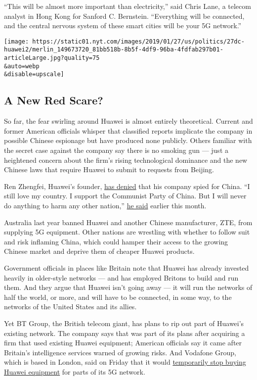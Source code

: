 ``This will be almost more important than electricity,'' said Chris
Lane, a telecom analyst in Hong Kong for Sanford C. Bernstein.
``Everything will be connected, and the central nervous system of these
smart cities will be your 5G network.''

\texttt{[image: https://static01.nyt.com/images/2019/01/27/us/politics/27dc-huawei2/merlin\_149673720\_81bb518b-8b5f-4df9-96ba-4fdfab297b01-articleLarge.jpg?quality=75\\\&auto=webp\\\&disable=upscale]}

\hypertarget{a-new-red-scare}{%
\subsection{A New Red Scare?}\label{a-new-red-scare}}

So far, the fear swirling around Huawei is almost entirely theoretical.
Current and former American officials whisper that classified reports
implicate the company in possible Chinese espionage but have produced
none publicly. Others familiar with the secret case against the company
say there is no smoking gun --- just a heightened concern about the
firm's rising technological dominance and the new Chinese laws that
require Huawei to submit to requests from Beijing.

Ren Zhengfei, Huawei's founder,
\href{https://www.nytimes.com/2019/01/15/technology/huawei-ren-zhengfei.html}{has
denied} that his company spied for China. ``I still love my country. I
support the Communist Party of China. But I will never do anything to
harm any other nation,''
\href{https://www.scmp.com/tech/big-tech/article/2182367/transcript-huawei-founder-ren-zhengfeis-responses-media-questions}{he
said} earlier this month.

Australia last year banned Huawei and another Chinese manufacturer, ZTE,
from supplying 5G equipment. Other nations are wrestling with whether to
follow suit and risk inflaming China, which could hamper their access to
the growing Chinese market and deprive them of cheaper Huawei products.

Government officials in places like Britain note that Huawei has already
invested heavily in older-style networks --- and has employed Britons to
build and run them. And they argue that Huawei isn't going away --- it
will run the networks of half the world, or more, and will have to be
connected, in some way, to the networks of the United States and its
allies.

Yet BT Group, the British telecom giant, has plans to rip out part of
Huawei's existing network. The company says that was part of its plans
after acquiring a firm that used existing Huawei equipment; American
officials say it came after Britain's intelligence services warned of
growing risks. And Vodafone Group, which is based in London, said on
Friday that it would
\href{https://www.nytimes.com/2019/01/25/technology/vodafone-huawei.html}{temporarily
stop buying Huawei equipment} for parts of its 5G network.

